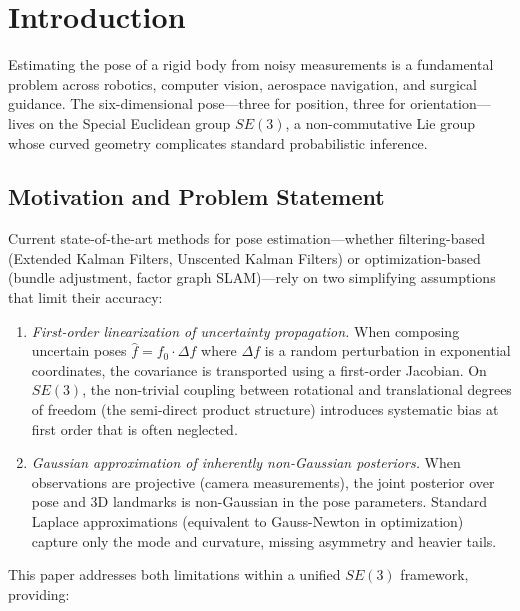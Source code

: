 \documentclass[journal]{IEEEtran}
\begin{document}
\section{Introduction}
\label{sec:intro}

Estimating the pose of a rigid body from noisy measurements is a 
fundamental problem across robotics, computer vision, aerospace 
navigation, and surgical guidance. The six-dimensional pose---three 
for position, three for orientation---lives on the Special Euclidean 
group $SE(3)$, a non-commutative Lie group whose curved geometry 
complicates standard probabilistic inference.

\subsection{Motivation and Problem Statement}

Current state-of-the-art methods for pose estimation---whether 
filtering-based (Extended Kalman Filters, Unscented Kalman Filters) 
or optimization-based (bundle adjustment, factor graph SLAM)---rely 
on two simplifying assumptions that limit their accuracy:

\begin{enumerate}
\item \emph{First-order linearization of uncertainty propagation.}
When composing uncertain poses $\hat{f} = f_0 \cdot \Delta f$ 
where $\Delta f$ is a random perturbation in exponential coordinates, 
the covariance is transported using a first-order Jacobian. 
On $SE(3)$, the non-trivial coupling between rotational and 
translational degrees of freedom (the semi-direct product structure) 
introduces systematic bias at first order that is often neglected.

\item \emph{Gaussian approximation of inherently non-Gaussian posteriors.}
When observations are projective (camera measurements), 
the joint posterior over pose and 3D landmarks is non-Gaussian 
in the pose parameters. Standard Laplace approximations 
(equivalent to Gauss-Newton in optimization) capture only the 
mode and curvature, missing asymmetry and heavier tails.
\end{enumerate}

This paper addresses both limitations within a unified $SE(3)$ 
framework, providing:
\end{document}
